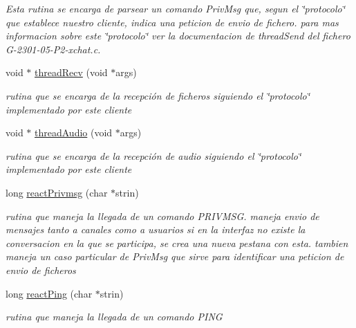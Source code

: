 \begin{DoxyCompactItemize}
\begin{DoxyCompactList}\small\item\em Esta rutina se encarga de parsear un comando Priv\-Msg que, segun el \char`\"{}protocolo\char`\"{} que establece nuestro cliente, indica una peticion de envio de fichero. para mas informacion sobre este \char`\"{}protocolo\char`\"{} ver la documentacion de thread\-Send del fichero G-\/2301-\/05-\/\-P2-\/xchat.\-c. \end{DoxyCompactList}\item 
void $\ast$ \hyperlink{_g-2301-05-_p2-basic_commands_from_server_8c_ae2661acad62b7c8480ba478251b4df77}{thread\-Recv} (void $\ast$args)
\begin{DoxyCompactList}\small\item\em rutina que se encarga de la recepción de ficheros siguiendo el \char`\"{}protocolo\char`\"{} implementado por este cliente \end{DoxyCompactList}\item 
void $\ast$ \hyperlink{_g-2301-05-_p2-basic_commands_from_server_8c_a143c8c1989387af8849fb5bd1f806584}{thread\-Audio} (void $\ast$args)
\begin{DoxyCompactList}\small\item\em rutina que se encarga de la recepción de audio siguiendo el \char`\"{}protocolo\char`\"{} implementado por este cliente \end{DoxyCompactList}\item 
long \hyperlink{_g-2301-05-_p2-basic_commands_from_server_8c_aa0f0ef9fd0a3facea1983061e1648e87}{react\-Privmsg} (char $\ast$strin)
\begin{DoxyCompactList}\small\item\em rutina que maneja la llegada de un comando P\-R\-I\-V\-M\-S\-G. maneja envio de mensajes tanto a canales como a usuarios si en la interfaz no existe la conversacion en la que se participa, se crea una nueva pestana con esta. tambien maneja un caso particular de Priv\-Msg que sirve para identificar una peticion de envio de ficheros \end{DoxyCompactList}\item 
long \hyperlink{_g-2301-05-_p2-basic_commands_from_server_8c_a1d15466f16cbf9847a16ac4bf24b34fb}{react\-Ping} (char $\ast$strin)
\begin{DoxyCompactList}\small\item\em rutina que maneja la llegada de un comando P\-I\-N\-G \end{DoxyCompactList}\item 

\end{DoxyCompactItemize}
